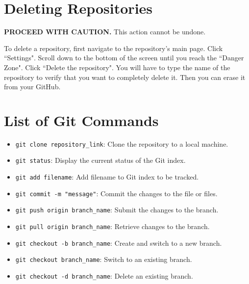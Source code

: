 \documentclass[11pt,a4paper]{article}
\begin{document}
\section*{Deleting Repositories}
\textbf{PROCEED WITH CAUTION.}
This action cannot be undone.

To delete a repository, first navigate to the repository's main page.
Click ``Settings".
Scroll down to the bottom of the screen until you reach the ``Danger Zone".
Click ``Delete the repository".
You will have to type the name of the repository to verify that you want to completely delete it.
Then you can erase it from your GitHub.

\section*{List of Git Commands}

\begin{itemize}
\item \texttt{git clone repository\_link}: Clone the repository to a local machine.
\item \texttt{git status}: Display the current status of the Git index.
\item \texttt{git add filename}: Add filename to Git index to be tracked.
\item \texttt{git commit -m "message"}: Commit the changes to the file or files. 
\item \texttt{git push origin branch\_name}: Submit the changes to the branch.
\item \texttt{git pull origin branch\_name}: Retrieve changes to the branch.
\item \texttt{git checkout -b branch\_name}: Create and switch to a new branch.
\item \texttt{git checkout branch\_name}: Switch to an existing branch.
\item \texttt{git checkout -d branch\_name}: Delete an existing branch.
\end{itemize}
\end{document}
